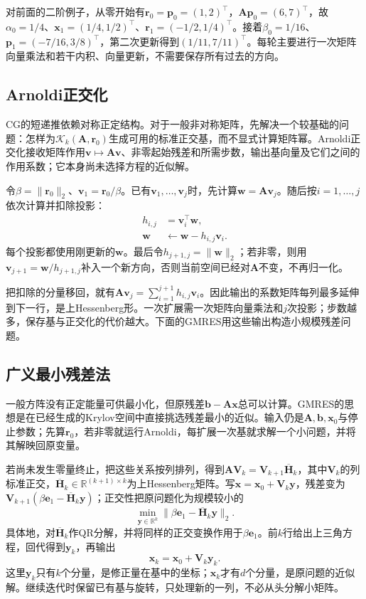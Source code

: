 对前面的二阶例子，从零开始有$\bm r_0=\bm p_0=(1,2)^\top$，$\bm A\bm p_0=(6,7)^\top$，故$\alpha_0=1/4$、$\bm x_1=(1/4,1/2)^\top$、$\bm r_1=(-1/2,1/4)^\top$。接着$\beta_0=1/16$、$\bm p_1=(-7/16,3/8)^\top$，第二次更新得到$(1/11,7/11)^\top$。每轮主要进行一次矩阵向量乘法和若干内积、向量更新，不需要保存所有过去的方向。

\subsection{Arnoldi正交化}

CG的短递推依赖对称正定结构。对于一般非对称矩阵，先解决一个较基础的问题：怎样为$\mathcal K_k(\bm A,\bm r_0)$生成可用的标准正交基，而不显式计算矩阵幂。Arnoldi正交化接收矩阵作用$\bm v\mapsto\bm A\bm v$、非零起始残差和所需步数，输出基向量及它们之间的作用系数；它本身尚未选择方程的近似解。

令$\beta=\|\bm r_0\|_2$、$\bm v_1=\bm r_0/\beta$。已有$\bm v_1,\ldots,\bm v_j$时，先计算$\bm w=\bm A\bm v_j$。随后按$i=1,\ldots,j$依次计算并扣除投影：
\begin{align*}
 h_{i,j}&=\bm v_i^\top\bm w,\\
 \bm w&\leftarrow\bm w-h_{i,j}\bm v_i.
\end{align*}
每个投影都使用刚更新的$\bm w$。最后令$h_{j+1,j}=\|\bm w\|_2$；若非零，则用$\bm v_{j+1}=\bm w/h_{j+1,j}$补入一个新方向，否则当前空间已经对$\bm A$不变，不再归一化。

把扣除的分量移回，就有$\bm A\bm v_j=\sum_{i=1}^{j+1}h_{i,j}\bm v_i$。因此输出的系数矩阵每列最多延伸到下一行，是上Hessenberg形。一次扩展需一次矩阵向量乘法和$j$次投影；步数越多，保存基与正交化的代价越大。下面的GMRES用这些输出构造小规模残差问题。

\subsection{广义最小残差法}

一般方阵没有正定能量可供最小化，但原残差$\bm b-\bm A\bm x$总可以计算。GMRES的思想是在已经生成的Krylov空间中直接挑选残差最小的近似。输入仍是$\bm A,\bm b,\bm x_0$与停止参数；先算$\bm r_0$，若非零就运行Arnoldi，每扩展一次基就求解一个小问题，并将其解映回原变量。

若尚未发生零量终止，把这些关系按列排列，得到$\bm A\bm V_k=\bm V_{k+1}\overline{\bm H}_k$，其中$\bm V_k$的列标准正交，$\overline{\bm H}_k\in\mathbb R^{(k+1)\times k}$为上Hessenberg矩阵。写$\bm x=\bm x_0+\bm V_k\bm y$，残差变为$\bm V_{k+1}(\beta\bm e_1-\overline{\bm H}_k\bm y)$；正交性把原问题化为规模较小的
\[
 \min_{\bm y\in\mathbb R^k}\lVert\beta\bm e_1-\overline{\bm H}_k\bm y\rVert_2.
\]
具体地，对$\overline{\bm H}_k$作QR分解，并将同样的正交变换作用于$\beta\bm e_1$。前$k$行给出上三角方程，回代得到$\bm y_k$，再输出
\[
 \bm x_k=\bm x_0+\bm V_k\bm y_k.
\]
这里$\bm y_k$只有$k$个分量，是修正量在基中的坐标；$\bm x_k$才有$d$个分量，是原问题的近似解。继续迭代时保留已有基与旋转，只处理新的一列，不必从头分解小矩阵。

